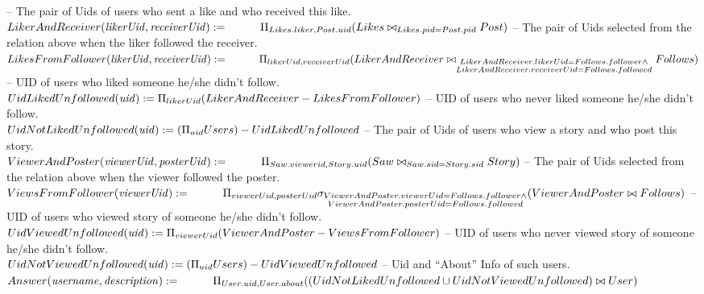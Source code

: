 \documentclass{article}
\newcommand{\var}[1]{\mathit{#1}}
\begin{document}
\begin{enumerate}
{-- The pair of Uids of users who sent a like and who received this like. \\[5pt]
$
LikerAndReceiver(\var{likerUid, receiverUid}) := \\[5pt]
	\hspace*{1cm}
	\Pi_{Likes.liker, Post.uid}
	(Likes \bowtie_{Likes.pid = Post.pid} Post) \\[10pt]
$
-- The pair of Uids selected from the relation above when the liker followed the receiver. \\[5pt]
$
LikesFromFollower(\var{likerUid, receiverUid}) := \\[5pt]
	\hspace*{1cm}
	\Pi_{likerUid, receiverUid}
	(LikerAndReceiver \bowtie_{\substack{LikerAndReceiver.likerUid = Follows.follower \wedge \\ LikerAndReceiver.receiverUid = Follows.followed}} Follows) \\[10pt]
$
-- UID of users who liked someone he/she didn't follow. \\[5pt]
$
UidLikedUnfollowed(\var{uid}) := 
	\Pi_{likerUid}
	(LikerAndReceiver - LikesFromFollower) \\[10pt]
$
-- UID of users who never liked someone he/she didn't follow. \\[5pt]
$
UidNotLikedUnfollowed(\var{uid}) :=
	(\Pi_{uid} Users) - UidLikedUnfollowed \\[10pt]
$
-- The pair of Uids of users who view a story and who post this story. \\[5pt]
$
ViewerAndPoster(\var{viewerUid, posterUid}) := \\[5pt]
	\hspace*{1cm}
	\Pi_{Saw.viewerid, Story.uid}
	(Saw \bowtie_{Saw.sid = Story.sid} Story) \\[10pt]
$
-- The pair of Uids selected from the relation above when the viewer followed the poster. \\[5pt]
$
ViewsFromFollower(\var{viewerUid}) := \\[5pt]
	\hspace*{1cm}
	\Pi_{viewerUid, posterUid}
	\sigma_{\substack{ViewerAndPoster.viewerUid = Follows.follower \wedge \\ ViewerAndPoster.posterUid = Follows.followed}}
	(ViewerAndPoster \bowtie Follows) \\[10pt]
$
-- UID of users who viewed story of someone he/she didn't follow. \\[5pt]
$
UidViewedUnfollowed(\var{uid}) :=
	\Pi_{viewerUid} (ViewerAndPoster - ViewsFromFollower) \\[10pt]
$
-- UID of users who never viewed story of someone he/she didn't follow. \\[5pt]
$
UidNotViewedUnfollowed(\var{uid}) :=
	(\Pi_{uid} Users) - UidViewedUnfollowed \\[10pt]
$
-- Uid and ``About'' Info of such users. \\[5pt]
$
Answer(\var{username, description}) := \\[10pt]
	\hspace*{1cm}
	\Pi_{User.uid, User.about}
	((UidNotLikedUnfollowed \cup UidNotViewedUnfollowed) \bowtie User)
$
} %



\end{enumerate}
\end{document}
